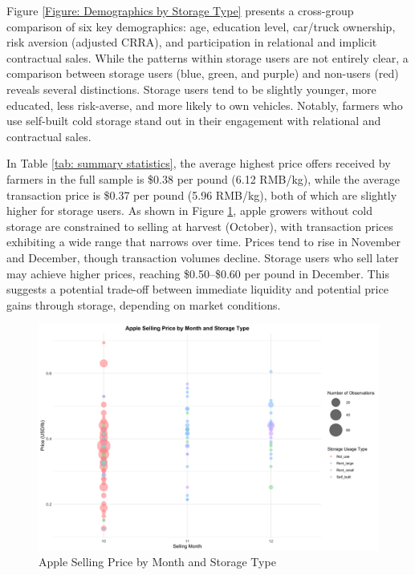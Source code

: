 \documentclass[12pt]{article}
\begin{document}
Figure \ref{Figure: Demographics by Storage Type} presents a cross-group comparison of six key demographics: age, education level, car/truck ownership, risk aversion (adjusted CRRA), and participation in relational and implicit contractual sales. While the patterns within storage users are not entirely clear, a comparison between storage users (blue, green, and purple) and non-users (red) reveals several distinctions. Storage users tend to be slightly younger, more educated, less risk-averse, and more likely to own vehicles. Notably, farmers who use self-built cold storage stand out in their engagement with relational and contractual sales.




In Table \ref{tab: summary statistics}, the average highest price offers received by farmers in the full sample is \$0.38 per pound (6.12 RMB/kg), while the average transaction price is \$0.37 per pound (5.96 RMB/kg), both of which are slightly higher for storage users. As shown in Figure \ref{Figure: selling price bubble}, apple growers without cold storage are constrained to selling at harvest (October), with transaction prices exhibiting a wide range that narrows over time. Prices tend to rise in November and December, though transaction volumes decline. Storage users who sell later may achieve higher prices, reaching \$0.50–\$0.60 per pound in December. This suggests a potential trade-off between immediate liquidity and potential price gains through storage, depending on market conditions.

\begin{figure}[H]
\centering
\includegraphics[width=1\textwidth]{figures/apple_price_bubble_plot.png}
\caption{Apple Selling Price by Month and Storage Type}
\label{Figure: selling price bubble}
\end{figure}
\end{document}
